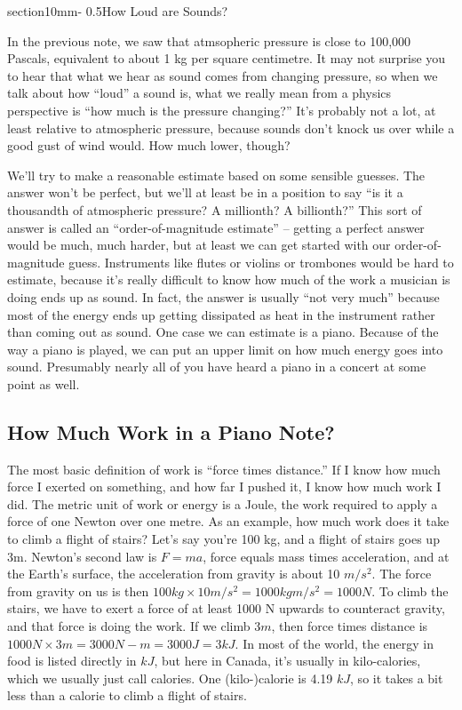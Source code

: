 \documentclass[letterpaper,11pt,preprint]{aastex}
\makeatletter
\renewcommand{\section}{\@startsection%
{section}{1}{0mm}{-\baselineskip}%
{0.5\baselineskip}{\normalfont\Large\bfseries}}%
\makeatother
\begin{document}
\pagestyle{plain}

\section{How Loud are Sounds?}

In the previous note, we saw that atmsopheric pressure is close to
100,000 Pascals, equivalent to about 1 kg per square centimetre.  It
may not surprise you to hear that what we hear as sound comes from
changing pressure, so when we talk about how ``loud'' a sound is, what
we really mean from a physics perspective is ``how much is the
pressure changing?''  It's probably not a lot, at least relative to
atmospheric pressure, because sounds don't knock us over while a good
gust of wind would.  How much lower, though?

We'll try to make a reasonable estimate based on some sensible
guesses.  The answer won't be perfect, but we'll at least be in a
position to say ``is it a thousandth of atmospheric pressure?  A
millionth?  A billionth?''  This sort of answer is called an
``order-of-magnitude estimate'' -- getting a perfect answer would be
much, much harder, but at least we can get started with our
order-of-magnitude guess.  Instruments like flutes or violins or
trombones would be hard to estimate, because it's really difficult to
know how much of the work a musician is doing ends up as sound.  In
fact, the answer is usually ``not very much'' because most of the
energy ends up getting dissipated as heat in the instrument rather
than coming out as sound.  One case we can estimate is a piano.
Because of the way a piano is played, we can put an upper limit on how
much energy goes into sound.  Presumably nearly all of you have heard
a piano in a concert at some point as well.  

\subsection{How Much Work in a Piano Note?}
The most basic definition of work is ``force times distance.''  If I
know how much force I exerted on something, and how far I pushed it, I
know how much work I did.  The metric unit of work or energy is a
Joule, the work required to apply a force of one Newton over one
metre.  As an example, how much work does it take to climb a flight of
stairs?  Let's say you're 100 kg, and a flight of stairs goes up 3m.
Newton's second law is $F=ma$, force equals mass times acceleration,
and at the Earth's surface, the acceleration from gravity is about 10
$m/s^2$.  The force from gravity on us is then $100 kg \times 10 m/s^2
= 1000 kg m/s^2=1000 N$.  To climb the stairs, we have to exert a
force of at least 1000 N upwards to counteract gravity, and that force
is doing the work.  If we climb 3$m$, then force times distance is
$1000N \times 3m = 3000 N-m = 3000J = 3kJ$.  In most of the world, the
energy in food is listed directly in $kJ$, but here in Canada, it's
usually in kilo-calories, which we usually just call calories.  One
(kilo-)calorie is 4.19 $kJ$, so it takes a bit less than a calorie to
climb a flight of stairs.
\end{document}
